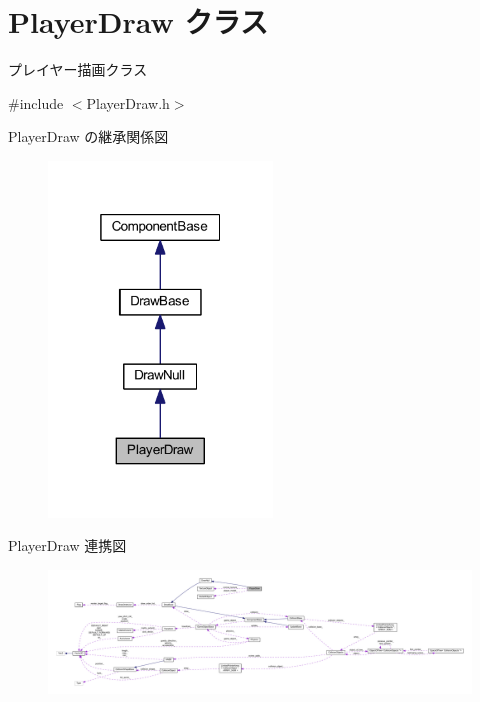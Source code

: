 \hypertarget{class_player_draw}{}\section{Player\+Draw クラス}
\label{class_player_draw}


プレイヤー描画クラス  




{\ttfamily \#include $<$Player\+Draw.\+h$>$}



Player\+Draw の継承関係図\nopagebreak
\begin{figure}[H]
\begin{center}
\leavevmode
\includegraphics[width=169pt]{class_player_draw__inherit__graph}
\end{center}
\end{figure}


Player\+Draw 連携図\nopagebreak
\begin{figure}[H]
\begin{center}
\leavevmode
\includegraphics[width=350pt]{class_player_draw__coll__graph}
\end{center}
\end{figure}
